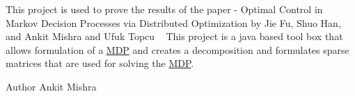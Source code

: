 This project is used to prove the results of the paper -\/ Optimal Control in Markov Decision Processes via Distributed Optimization by Jie Fu, Shuo Han, and Ankit Mishra and Ufuk Topcu ~\newline
This project is a java based tool box that allows formulation of a \hyperlink{classese_1_1seas_1_1upenn_1_1edu_1_1_m_d_p}{M\+D\+P} and creates a decomposition and formulates sparse matrices that are used for solving the \hyperlink{classese_1_1seas_1_1upenn_1_1edu_1_1_m_d_p}{M\+D\+P}. \begin{DoxyAuthor}{Author}
Ankit Mishra 
\end{DoxyAuthor}
